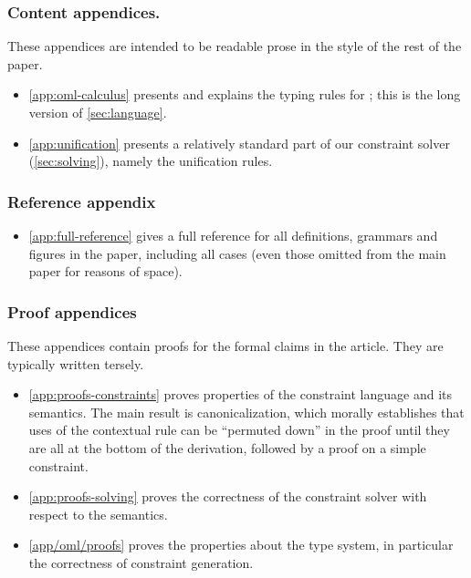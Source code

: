 \documentclass[acmsmall,screen,nonacm,review]{acmart}
\begin{document}
\begin{local}
\renewcommand{\paragraph}[1]{\subsubsection*{#1}}

\paragraph{Content appendices.} These appendices are intended to be
readable prose in the style of the rest of the paper.

\begin{itemize}
\item \cref{app:oml-calculus} presents and explains the typing rules for \OML;
  this is the long version of \cref{sec:language}.
\item \cref{app:unification} presents a relatively standard part of our constraint solver (\cref{sec:solving}),
  namely the unification rules.
\end{itemize}

\paragraph{Reference appendix}
\begin{itemize}
\item \cref{app:full-reference} gives a full reference for all
  definitions, grammars and figures in the paper, including all cases
  (even those omitted from the main paper for reasons of space).
\end{itemize}

\paragraph{Proof appendices} These appendices contain proofs for the
formal claims in the article. They are typically written tersely.
\begin{itemize}
\item \cref{app:proofs-constraints} proves properties of the
  constraint language and its semantics. The main result is
  canonicalization, which morally establishes that uses of the
  contextual rule  can be ``permuted down'' in the
  proof until they are all at the bottom of the derivation, followed
  by a proof on a simple constraint.
\item \cref{app:proofs-solving} proves the correctness of the
  constraint solver with respect to the semantics.
\item \cref{app/oml/proofs} proves the properties about the \OML
  type system, in particular the correctness of constraint generation.
\end{itemize}

\end{local}
\end{document}
